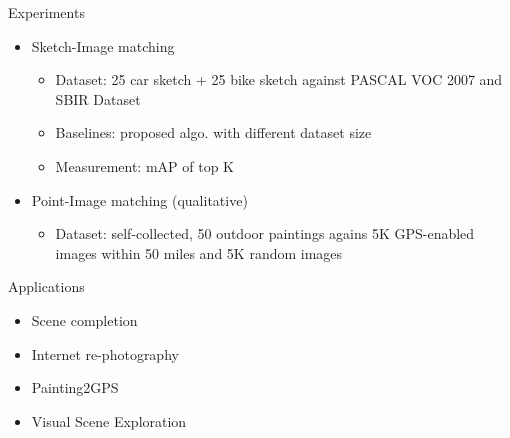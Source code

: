 \documentclass[12pt]{beamer}
\begin{document}
\begin{frame}{Experiments}
	\begin{itemize}
		\item Sketch-Image matching
		\begin{itemize}
			\item Dataset: 25 car sketch + 25 bike sketch against PASCAL VOC 2007 and SBIR Dataset
			\item Baselines: proposed algo. with different dataset size
			\item Measurement: mAP of top K
		\end{itemize}
		\item Point-Image matching (qualitative)
		\begin{itemize}
			\item Dataset: self-collected, 50 outdoor paintings agains 5K GPS-enabled images within 50 miles and 5K random images
		\end{itemize}
	\end{itemize}
\end{frame}

\begin{frame}{Applications}
	\begin{itemize}
		\item Scene completion
		\item Internet re-photography
		\item Painting2GPS
		\item Visual Scene Exploration
	\end{itemize}
\end{frame}
\end{document}
